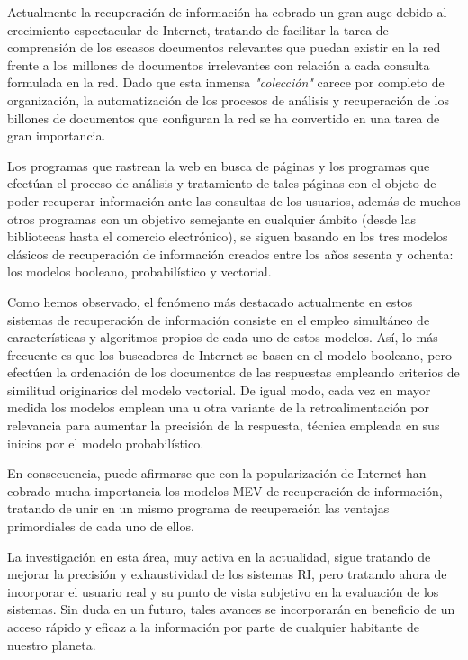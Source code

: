 \documentclass[titlepage]{article}
\begin{document}
Actualmente la recuperación de información ha cobrado un gran auge debido al crecimiento espectacular de Internet, tratando de facilitar la tarea de comprensión de los escasos documentos relevantes que puedan existir en la red frente a los millones de documentos irrelevantes con relación a cada consulta formulada en la red. Dado que esta inmensa \textit{"colección"} carece por completo de organización, la automatización de los procesos de análisis y recuperación de los billones de documentos que configuran la red se ha convertido en una tarea de gran importancia.

Los programas que rastrean la web en busca de páginas y los programas que efectúan el proceso de análisis y tratamiento de tales páginas con el objeto de poder recuperar información ante las consultas de los usuarios, además de muchos otros programas con un objetivo semejante en cualquier ámbito (desde las bibliotecas hasta el comercio electrónico), se siguen basando en los tres modelos clásicos de recuperación de información creados entre los años sesenta y ochenta: los modelos booleano, probabilístico y vectorial. 

Como hemos observado, el fenómeno más destacado actualmente en estos sistemas de recuperación de información consiste en el empleo simultáneo de características y algoritmos propios de cada uno de estos modelos. Así, lo más frecuente es que los buscadores de Internet se basen en el modelo booleano, pero efectúen la ordenación de los documentos de las respuestas empleando criterios de similitud originarios del modelo vectorial. De igual modo, cada vez en mayor medida los modelos emplean una u otra variante de la retroalimentación por relevancia para aumentar la precisión de la respuesta, técnica empleada en sus inicios por el modelo probabilístico.

En consecuencia, puede afirmarse que con la popularización de Internet han cobrado mucha importancia los modelos MEV de recuperación de información, tratando de unir en un mismo programa de recuperación las ventajas primordiales de cada uno de ellos. 

La investigación en esta área, muy activa en la actualidad, sigue tratando de mejorar la precisión y exhaustividad de los sistemas RI, pero tratando ahora de incorporar el usuario real y su punto de vista subjetivo en la evaluación de los sistemas. Sin duda en un futuro, tales avances se incorporarán en beneficio de un acceso rápido y eficaz a la información por parte de cualquier habitante de nuestro planeta.
\end{document}

